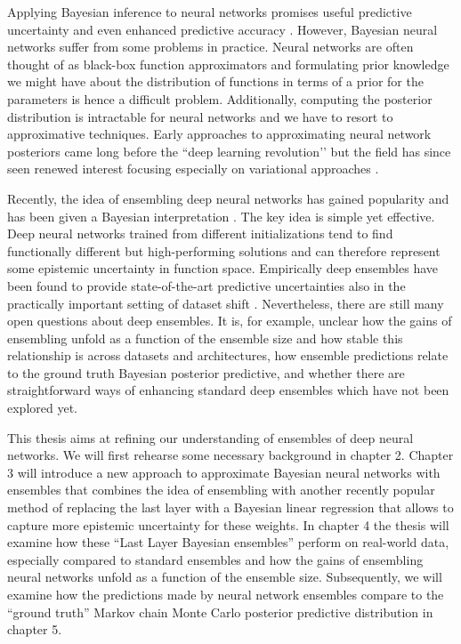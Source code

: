 \documentclass[../thesis.tex]{subfiles}
\begin{document}
Applying Bayesian inference to neural networks promises useful predictive uncertainty and even enhanced predictive accuracy \parencite{wilson2020case}. However, Bayesian neural networks suffer from some problems in practice. Neural networks are often thought of as black-box function approximators and formulating prior knowledge we might have about the distribution of functions in terms of a prior for the parameters is hence a difficult problem. Additionally, computing the posterior distribution is intractable for neural networks and we have to resort to approximative techniques. Early approaches to approximating neural network posteriors came long before the ``deep learning revolution’’ \parencite{mackay1992practical, neal1995bayesian} but the field has since seen renewed interest focusing especially on variational approaches \parencite{graves2011practical, hernandez2015probabilistic, blundell2015weight}. 

Recently, the idea of ensembling deep neural networks has gained popularity \parencite{lakshminarayanan2017simple} and has been given a Bayesian interpretation \parencite{wilson2020case}. The key idea is simple yet effective. Deep neural networks trained from different initializations tend to find functionally different but high-performing solutions and can therefore represent some epistemic uncertainty in function space. Empirically deep ensembles have been found to provide state-of-the-art predictive uncertainties also in the practically important setting of dataset shift \parencite{ovadia2019can}. Nevertheless, there are still many open questions about deep ensembles. It is, for example, unclear how the gains of ensembling unfold as a function of the ensemble size and how stable this relationship is across datasets and architectures, how ensemble predictions relate to the ground truth Bayesian posterior predictive, and whether there are straightforward ways of enhancing standard deep ensembles which have not been explored yet.

This thesis aims at refining our understanding of ensembles of deep neural networks. We will first rehearse some necessary background in chapter 2. Chapter 3 will introduce a new approach to approximate Bayesian neural networks with ensembles that combines the idea of ensembling with another recently popular method of replacing the last layer with a Bayesian linear regression that allows to capture more epistemic uncertainty for these weights. In chapter 4 the thesis will examine how these ``Last Layer Bayesian ensembles'' perform on real-world data, especially compared to standard ensembles and how the gains of ensembling neural networks unfold as a function of the ensemble size. Subsequently, we will examine how the predictions made by neural network ensembles compare to the ``ground truth'' Markov chain Monte Carlo posterior predictive distribution in chapter 5. 
\end{document}
